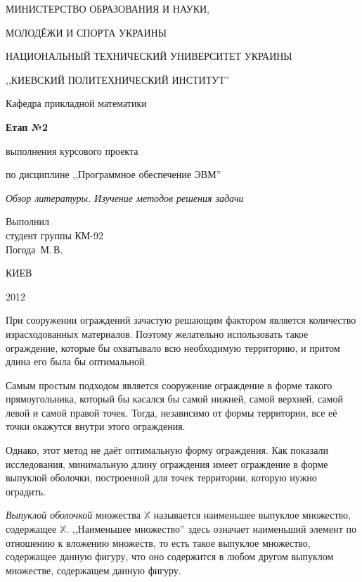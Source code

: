 \documentclass[a4paper,12pt,notitlepage,headsepline,pdftex]{scrartcl}
\begin{document}
\begin{titlepage}
  \begin{center}
    \large
    \MakeUppercase{Министерство образования и науки,}

    \MakeUppercase{молодёжи и спорта Украины}

    \MakeUppercase{Национальный технический университет Украины}

    \MakeUppercase{,,Киевский политехнический институт''}

    \addvspace{6pt}

    \normalsize
    Кафедра прикладной математики

    \vfill

    \textbf{Етап №2}

    выполнения курсового проекта

    по дисциплине ,,Программное обеспечение ЭВМ''

    \emph{Обзор литературы. Изучение методов решения задачи}
  \end{center}

  \vfill

  \noindent
  Выполнил\\
  студент группы КМ-92\\
  Погода~М.\,В.\\
  \vfill

  \begin{center}
    КИЕВ

    2012
  \end{center}
\end{titlepage}


  При сооружении ограждений зачастую решающим фактором является количество
  израсходованных материалов.
  Поэтому желательно использовать такое ограждение, которые бы охватывало всю
  необходимую территорию, и притом длина его была бы оптимальной.

  Самым простым подходом является сооружение ограждение в форме такого
  прямоугольника, который бы касался бы самой нижней, самой верхней, самой
  левой и самой правой точек.
  Тогда, независимо от формы территории, все её точки окажутся внутри этого
  ограждения.

  Однако, этот метод не даёт оптимальную форму ограждения.
  Как показали исследования, минимальную длину ограждения имеет ограждение в
  форме выпуклой оболочки, построенной для точек территории, которую нужно
  оградить.\cite{book1}

  \emph{Выпуклой оболочкой} множества $\mathbb{X}$ называется наименьшее
  выпуклое множество, содержащее $\mathbb{X}$.
  ,,Наименьшее множество'' здесь означает наименьший элемент по отношению к
  вложению множеств, то есть такое выпуклое множество, содержащее данную
  фигуру, что оно содержится в любом другом выпуклом множестве, содержащем
  данную фигуру.\cite{book2}
\end{document}
